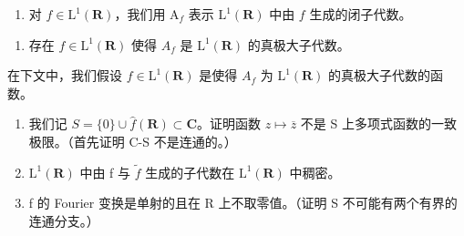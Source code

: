 \begin{enumerate}
\def\labelenumi{\arabic{enumi})}
\setcounter{enumi}{18}
\tightlist
\item
  对 \(f \in \mathrm{L}^1(\mathbf{R})\)，我们用 \(\mathrm{A}_f\) 表示 \(\mathrm{L}^1(\mathbf{R})\) 中由 \(f\) 生成的闭子代数。
\end{enumerate}

\begin{enumerate}
\def\labelenumi{\alph{enumi})}
\tightlist
\item
  存在 \(f \in \mathrm{L}^{1}(\mathbf{R})\) 使得 \(A_{f}\) 是 \(\mathrm{L}^{1}(\mathbf{R})\) 的真极大子代数。
\end{enumerate}

在下文中，我们假设 \(f \in \mathrm{L}^{1}(\mathbf{R})\) 是使得 \(A_{f}\) 为 \(\mathrm{L}^{1}(\mathbf{R})\) 的真极大子代数的函数。

\begin{enumerate}
\def\labelenumi{\alph{enumi})}
\setcounter{enumi}{1}
\item
  我们记 \(S = \{0\} \cup \widehat{f}(\mathbf{R}) \subset \mathbf{C}\)。证明函数 \(z \mapsto \overline{z}\) 不是 S 上多项式函数的一致极限。（首先证明 C-S 不是连通的。）
\item
  \(\mathrm{L}^{1}(\mathbf{R})\) 中由 f 与 \(\widetilde{f}\) 生成的子代数在 \(\mathrm{L}^{1}(\mathbf{R})\) 中稠密。
\item
  f 的 Fourier 变换是单射的且在 R 上不取零值。（证明 S 不可能有两个有界的连通分支。）
\end{enumerate}

\backmatter
